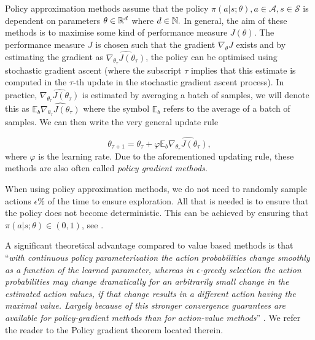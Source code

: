 Policy approximation methods assume that the policy $\pi(a|s;\theta), a \in \mathcal{A}, s \in \mathcal{S}$ is dependent on parameters $\theta \in \mathbb{R}^d$ where $d \in \mathbb{N}.$ In general, the aim of these methods is to maximise some kind of performance measure $J(\theta)$. The performance measure $J$ is chosen such that the gradient $\nabla_{\theta}J$ exists and by estimating the gradient as $\widehat{\nabla_{\theta_{\tau}} J(\theta_{\tau})}$, the policy can be optimised using stochastic gradient ascent (where the subscript $\tau$ implies that this estimate is computed in the $\tau$-th update in the stochastic gradient ascent process). In practice, $\widehat{\nabla_{\theta_{\tau}} J(\theta_{\tau})}$ is estimated by averaging a batch of samples, we will denote this as $\mathbb{E}_b \widehat{\nabla_{\theta_{\tau}} J(\theta_{\tau})}$ where the symbol $\mathbb{E}_b$ refers to the average of a batch of samples. We can then write the very general update rule

%
\begin{equation*}
\label{eq:policy_approximation_updating_rule}
\theta_{\tau+1}=\theta_{\tau}+\varphi \mathbb{E}_b\widehat{\nabla_{\theta_{\tau}} J(\theta_{\tau})},
\end{equation*}
where $\varphi$ is the learning rate.
Due to the aforementioned updating rule, these methods are also often called \textit{policy gradient methods}. 

\begin{rem} 
When using policy approximation methods, we do not need to randomly sample actions $\epsilon \%$ of the time to ensure exploration. All that is needed is to ensure that the policy does not become deterministic. This can be achieved by ensuring that $\pi(a|s;\theta) \in (0,1)$, see \cite[Section 13.1]{sutton2018reinforcement}.
\end{rem}

A significant theoretical advantage compared to value based methods is that “\textit{with continuous policy parameterization the action probabilities change smoothly as a function of the learned parameter, whereas in $\epsilon$-greedy selection the action probabilities may change dramatically for an arbitrarily small change in the estimated action values, if that change results in a different action having the maximal value. Largely because of this stronger convergence guarantees are available for policy-gradient methods than for action-value methods}” \cite[Section 13.2]{sutton2018reinforcement}. We refer the reader to the Policy gradient theorem located therein.

